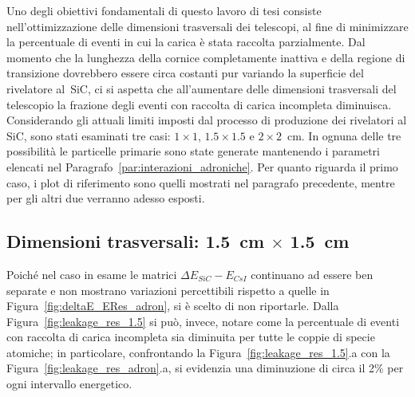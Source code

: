 Uno degli obiettivi fondamentali di questo lavoro di tesi consiste nell'ottimizzazione delle dimensioni trasversali dei telescopi, al fine di minimizzare la percentuale di eventi in cui la carica è stata raccolta parzialmente. 
Dal momento che la lunghezza della cornice completamente inattiva e della regione di transizione dovrebbero essere circa costanti pur variando la superficie del rivelatore al~SiC, ci si aspetta che all'aumentare delle dimensioni trasversali del telescopio la frazione degli eventi con raccolta di carica incompleta diminuisca.
Considerando gli attuali limiti imposti dal processo di produzione dei rivelatori al SiC, sono stati esaminati tre casi: $1 \times 1$, $1.5 \times 1.5$ e $2 \times 2$~cm. 
In ognuna delle tre possibilità le particelle primarie sono state generate mantenendo i parametri elencati nel Paragrafo~\ref{par:interazioni_adroniche}.
Per quanto riguarda il primo caso, i plot di riferimento sono quelli mostrati nel paragrafo precedente, mentre per gli altri due verranno adesso esposti.

\subsection*{Dimensioni trasversali: 1.5~cm $\times$ 1.5~cm}




Poiché nel caso in esame le matrici $\Delta E_{SiC} - E_{CsI}$ continuano ad essere ben separate e non mostrano variazioni percettibili rispetto a quelle in Figura~\ref{fig:deltaE_ERes_adron}, si è scelto di non riportarle.
Dalla Figura~\ref{fig:leakage_res_1.5} si può, invece, notare come la percentuale di eventi con raccolta di carica incompleta sia diminuita per tutte le coppie di specie atomiche; in particolare, confrontando la Figura~\ref{fig:leakage_res_1.5}.a con la Figura~\ref{fig:leakage_res_adron}.a, si evidenzia una diminuzione di circa il 2\% per ogni intervallo energetico.


